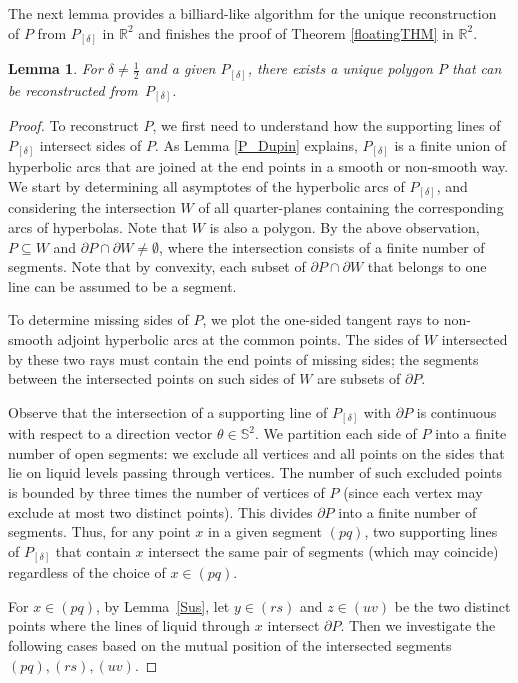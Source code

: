 \documentclass[12pt,letterpaper,reqno]{amsart}
\newtheorem{lemma}{Lemma}
\begin{document}
The next lemma provides a billiard-like algorithm for the unique reconstruction of $P$ from $P_{[\delta]}$ in $\mathbb{R}^2$ and finishes the proof of Theorem \ref{floatingTHM} in $\mathbb{R}^2$.
\begin{lemma}
    For $\delta \neq \frac{1}{2}$ and a given $P_{[\delta]}$, there exists a unique polygon $P$ that can be reconstructed from~$P_{[\delta]}$.
\end{lemma}
\begin{proof}
    To reconstruct $P$, we first need to understand how the supporting lines of $P_{[\delta]}$ intersect sides of $P$. As Lemma \ref{P_Dupin} explains, $P_{[\delta]}$ is a finite union of hyperbolic arcs that are joined at the end points in a smooth or non-smooth way. We start by determining all asymptotes of the hyperbolic arcs of $P_{[\delta]}$, and considering the intersection $W$ of all quarter-planes containing the corresponding arcs of hyperbolas. Note that $W$ is also a polygon. By the above observation, $P \subseteq W$ and $\partial P \cap \partial W \neq \emptyset$, where the intersection consists of a finite number of segments. Note that by convexity, each subset of $\partial P \cap \partial W$ that belongs to one line can be assumed to be a segment.
    
    To determine missing sides of $P$, we plot the one-sided tangent rays to non-smooth adjoint hyperbolic arcs at the common points. The sides of $W$ intersected by these two rays must contain the end points of missing sides; the segments between the intersected points on such sides of $W$ are subsets of $\partial P$.
    
    Observe that the intersection of a supporting line of $P_{[\delta]}$ with $\partial P$ is continuous with respect to a direction vector $\theta \in \mathbb{S}^2$.
    We partition each side of $P$ into a finite number of open segments: we exclude all vertices and all points on the sides that lie on liquid levels passing through vertices.
    The number of such excluded points is bounded by three times the number of vertices of $P$ (since each vertex may exclude at most two distinct points).
    This divides $\partial P$ into a finite number of segments. 
    Thus, for any point $x$ in a given segment $(pq)$, two supporting lines of $P_{[\delta]}$ that contain $x$ intersect the same pair of segments (which may coincide) regardless of the choice of $x \in (pq)$.

    
    For $x \in (pq)$, by Lemma~\ref{Sus}, let $y \in (rs)$ and $z \in (uv)$ be the two distinct points where the lines of liquid through $x$ intersect $\partial P$. 
    Then we investigate the following cases based on the mutual position of the intersected segments $(pq), (rs), (uv)$.


\end{proof}
\end{document}
